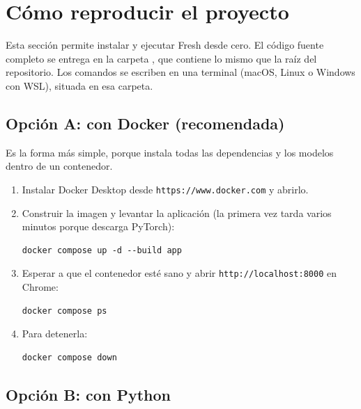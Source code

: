 \section{Cómo reproducir el proyecto}
\label{sec:reproduccion}

Esta sección permite instalar y ejecutar Fresh desde cero. El código fuente completo se entrega en la carpeta , que contiene lo mismo que la raíz del repositorio. Los comandos se escriben en una terminal (macOS, Linux o Windows con WSL), situada en esa carpeta.

\subsection{Opción A: con Docker (recomendada)}

Es la forma más simple, porque instala todas las dependencias y los modelos dentro de un contenedor.
\begin{enumerate}
  \item Instalar Docker Desktop desde \texttt{https://www.docker.com} y abrirlo.
  \item Construir la imagen y levantar la aplicación (la primera vez tarda varios minutos porque descarga PyTorch):
\begin{lstlisting}
docker compose up -d --build app
\end{lstlisting}
  \item Esperar a que el contenedor esté sano y abrir \texttt{http://localhost:8000} en Chrome:
\begin{lstlisting}
docker compose ps
\end{lstlisting}
  \item Para detenerla:
\begin{lstlisting}
docker compose down
\end{lstlisting}
\end{enumerate}

\subsection{Opción B: con Python}

